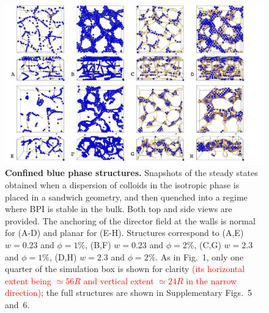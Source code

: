 \documentclass[12pt]{article}
\begin{document}
\begin{figure}
\centerline{\includegraphics[width=\textwidth]{text-fig2.jpg}}
\caption{\textbf{Confined blue phase structures.}
Snapshots of the steady states obtained when a dispersion of colloids in the isotropic phase is placed in a sandwich geometry, 
and then quenched into a regime where BPI is stable in the bulk. Both top and side views are provided.
The anchoring of the director field at the walls is normal for (A-D) and planar for (E-H). 
Structures correspond to (A,E) $w=0.23$ and $\phi=1\%$, 
(B,F) $w=0.23$ and $\phi=2\%$, 
(C,G) $w=2.3$ and $\phi=1\%$,
(D,H) $w=2.3$ and $\phi=2\%$.
As in Fig.~1, only one quarter of the simulation box is shown for clarity
\textcolor{red}{(its horizontal extent being $\simeq 56R$ and vertical
extent $\simeq 24R$ in the narrow direction)};
the full structures are shown in Supplementary Figs.~5 and~6.}
\end{figure}
\end{document}
